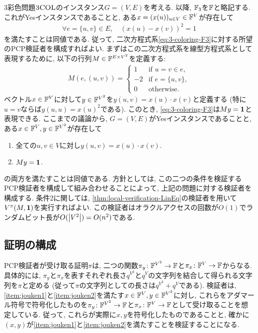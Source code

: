   3彩色問題$\textsc{3COL}$のインスタンス$G=(V,E)$を考える.
  以降, $\mathbb{F}_3$を$\mathbb{F}$と略記する.
  これがYesインスタンスであることと, ある$x=(x(u))_{u\in V}\in\mathbb{F}^V$が存在して
  \begin{align}
    \forall e=\{u,v\}\in E, \quad (x(u) - x(v))^2 = 1 \label{eq:3-coloring-F3}
  \end{align}
  を満たすことは同値である. 従って, 二次方程式系\cref{eq:3-coloring-F3}に対する所望のPCP検証者を構成すればよい.
  まずはこの二次方程式系を線型方程式系として表現するために, 以下の行列$M \in \mathbb{F}^{E \times V^2}$を定義する:
  \begin{align}
    M(e, (u,v)) = \begin{cases}
      1 & \text{if } u=v\in e,\\
      -2 & \text{if } e=\{u,v\},\\
      0 & \text{otherwise}.
    \end{cases} \label{eq:M-matrix}
  \end{align}
  ベクトル$x\in\mathbb{F}^V$に対して$y\in\mathbb{F}^{V^2}$を$y(u,v)=x(u)\cdot x(v)$と定義する (特に$u=v$ならば$y(u,u)=x(u)^2$である).
  このとき, \cref{eq:3-coloring-F3}は$My=\mathbf{1}$と表現できる.
  ここまでの議論から, $G=(V,E)$がYesインスタンスであることと, ある$x\in\mathbb{F}^V,y\in \mathbb{F}^{V^2}$が存在して
  \begin{enumerate}[label=\textbf{条件\arabic*}, leftmargin=1.5cm]
    \item 全ての$u,v\in V$に対し$y(u,v)=x(u)\cdot x(v)$. \label{item:jouken1}
    \item $My=\mathbf{1}$. \label{item:jouken2}
  \end{enumerate}
  の両方を満たすことは同値である.
  方針としては, この二つの条件を検証するPCP検証者を構成して組み合わせることによって, 上記の問題に対する検証者を構成する.
  条件2に関しては, \cref{thm:local-verification-LinEq}の検証者を用いて$V^\pi(M,\mathbf{1})$を実行すればよい.
  この検証者はオラクルアクセスの回数が$O(1)$でランダムビット長が$O(\abs{V^2})=O(n^2)$である.
  
  \subsection{証明の構成}
  PCP検証者が受け取る証明$\pi$は, 二つの関数$\pi_y\colon\mathbb{F}^{V^2}\to\mathbb{F}$と$\pi_x\colon\mathbb{F}^V\to\mathbb{F}$からなる.
  具体的には, $\pi_y$と$\pi_x$を表すそれぞれ長さ$q^{V^2}$と$q^V$の文字列を結合して得られる文字列を$\pi$と定める (従って$\pi$の文字列としての長さは$q^{V^2}+q^V$である).
  検証者は, \ref{item:jouken1}と\ref{item:jouken2}を満たす$x\in\mathbb{F}^V,y\in\mathbb{F}^{V^2}$に対し, これらをアダマール符号で符号化したものを$\pi_y\colon\mathbb{F}^{V^2}\to\mathbb{F}$と$\pi_x\colon\mathbb{F}^V\to\mathbb{F}$として受け取ることを想定している.
  従って, これらが実際に$x,y$を符号化したものであることと, 確かに$(x,y)$が\ref{item:jouken1}と\ref{item:jouken2}を満たすことを検証することになる.
  
